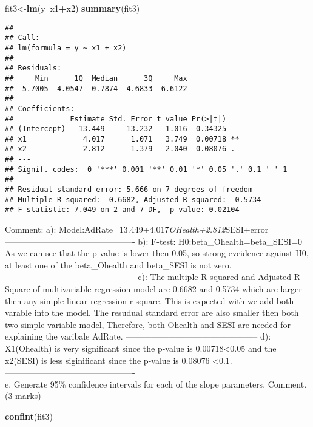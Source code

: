 \documentclass[11pt,]{article}
\newenvironment{Shaded}{\begin{snugshade}}{\end{snugshade}}
\newcommand{\KeywordTok}[1]{\textcolor[rgb]{0.13,0.29,0.53}{\textbf{#1}}}
\newcommand{\OperatorTok}[1]{\textcolor[rgb]{0.81,0.36,0.00}{\textbf{#1}}}
\newcommand{\NormalTok}[1]{#1}
\begin{document}
\begin{Shaded}
\begin{Highlighting}[]
\NormalTok{fit3<-}\KeywordTok{lm}\NormalTok{(y}\OperatorTok{~}\NormalTok{x1}\OperatorTok{+}\NormalTok{x2)}
\KeywordTok{summary}\NormalTok{(fit3)}
\end{Highlighting}
\end{Shaded}

\begin{verbatim}
## 
## Call:
## lm(formula = y ~ x1 + x2)
## 
## Residuals:
##     Min      1Q  Median      3Q     Max 
## -5.7005 -4.0547 -0.7874  4.6833  6.6122 
## 
## Coefficients:
##             Estimate Std. Error t value Pr(>|t|)   
## (Intercept)   13.449     13.232   1.016  0.34325   
## x1             4.017      1.071   3.749  0.00718 **
## x2             2.812      1.379   2.040  0.08076 . 
## ---
## Signif. codes:  0 '***' 0.001 '**' 0.01 '*' 0.05 '.' 0.1 ' ' 1
## 
## Residual standard error: 5.666 on 7 degrees of freedom
## Multiple R-squared:  0.6682, Adjusted R-squared:  0.5734 
## F-statistic: 7.049 on 2 and 7 DF,  p-value: 0.02104
\end{verbatim}

Comment: a): Model:AdRate=13.449+4.017\emph{OHealth+2.812}SESI+error
---------------------------------------------- b): F-test:
H0:beta\_Ohealth=beta\_SESI=0 As we can see that the p-value is lower
then 0.05, so strong eveidence against H0, at least one of the
beta\_Ohealth and beta\_SESI is not zero.
---------------------------------------------- c): The multiple
R-squared and Adjusted R-Square of multivariable regression model are
0.6682 and 0.5734 which are larger then any simple linear regression
r-square. This is expected with we add both varable into the model. The
resudual standard error are also smaller then both two simple variable
model, Therefore, both Ohealth and SESI are needed for explaining the
varibale AdRate. ----------------------------------------------- d):
X1(Ohealth) is very significant since the p-value is
0.00718\textless{}0.05 and the x2(SESI) is less siginificant since the
p-value is 0.08076 \textless{}0.1.
----------------------------------------------\\
e. Generate 95\% confidence intervals for each of the slope parameters.
Comment. (3 marks)

\begin{Shaded}
\begin{Highlighting}[]
 \KeywordTok{confint}\NormalTok{(fit3)}
\end{Highlighting}
\end{Shaded}
\end{document}
